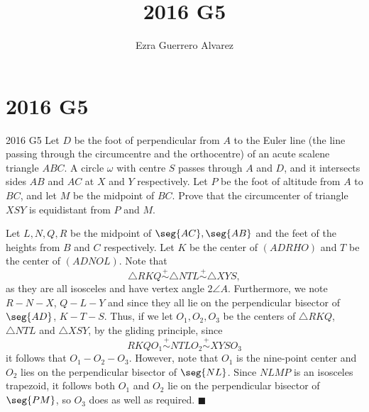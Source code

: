 \documentclass[14pt]{article}
\title{2016 G5}
\author{Ezra Guerrero Alvarez}
\begin{document}
\maketitle
	
\section*{2016 G5}

\begin{statement}{2016 G5}
	Let $D$ be the foot of perpendicular from $A$ to the Euler line (the line passing through the circumcentre and the orthocentre) of an acute scalene triangle $ABC$. A circle $\omega$ with centre $S$ passes through $A$ and $D$, and it intersects sides $AB$ and $AC$ at $X$ and $Y$ respectively. Let $P$ be the foot of altitude from $A$ to $BC$, and let $M$ be the midpoint of $BC$. Prove that the circumcenter of triangle $XSY$ is equidistant from $P$ and $M$.
\end{statement}
Let $L,N,Q,R$ be the midpoint of $\seg{AC},\seg{AB}$ and the feet of the heights from $B$ and $C$ respectively. Let $K$ be the center of $(ADRHO)$ and $T$ be the center of $(ADNOL)$. Note that
\[ \triangle RKQ \stackrel+\sim \triangle NTL \stackrel+\sim \triangle XYS, \]
as they are all isosceles and have vertex angle $2\angle A$. Furthermore, we note $R-N-X$, $Q-L-Y$ and since they all lie on the perpendicular bisector of $\seg{AD}$, $K-T-S$. Thus, if we let $O_1, O_2, O_3$ be the centers of $\triangle RKQ$, $\triangle NTL$ and $\triangle XSY$, by the gliding principle, since
\[ RKQO_1 \stackrel+\sim NTLO_2 \stackrel+\sim XYSO_3 \]
it follows that $O_1-O_2-O_3$. However, note that $O_1$ is the nine-point center and $O_2$ lies on the perpendicular bisector of $\seg{NL}$. Since $NLMP$ is an isosceles trapezoid, it follows both $O_1$ and $O_2$ lie on the perpendicular bisector of $\seg{PM}$, so $O_3$ does as well as required. $\blacksquare$ 
	
\end{document}
